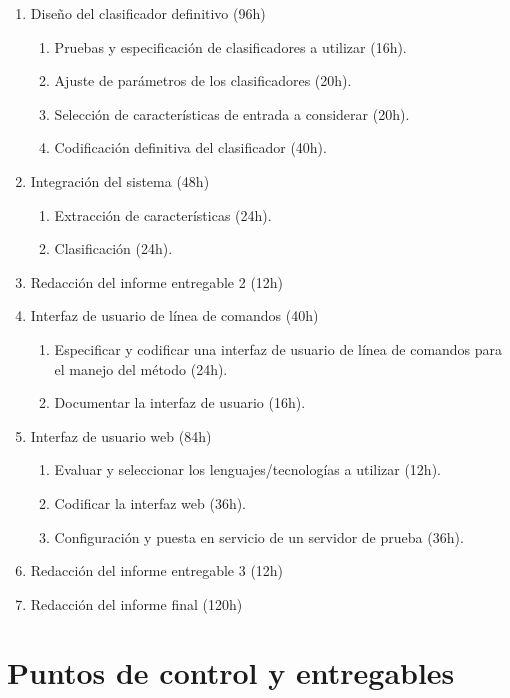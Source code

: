 \documentclass[bibliography=openstyle,DIV=12]{scrartcl}
\begin{document}
\begin{enumerate}
\item Diseño del clasificador definitivo (96h)
  \begin{enumerate}
  \item Pruebas y especificación de clasificadores a utilizar (16h).
  \item Ajuste de parámetros de los clasificadores (20h).
  \item Selección de características de entrada a considerar (20h).
  \item Codificación definitiva del clasificador (40h).
  \end{enumerate}
\item Integración del sistema (48h)
  \begin{enumerate}
  \item Extracción de características (24h).
  \item Clasificación (24h).
  \end{enumerate}
\item Redacción del informe entregable 2 (12h)
\item Interfaz de usuario de línea de comandos (40h)
  \begin{enumerate}
  \item Especificar y codificar una interfaz de usuario de línea de comandos para el manejo del método (24h).
  \item Documentar la interfaz de usuario (16h).
  \end{enumerate}
\item Interfaz de usuario web (84h)
  \begin{enumerate}
  \item Evaluar y seleccionar los lenguajes/tecnologías a utilizar (12h).
  \item Codificar la interfaz web (36h).
  \item Configuración y puesta en servicio de un servidor de prueba (36h).
  \end{enumerate}
\item Redacción del informe entregable 3 (12h)
\item Redacción del informe final (120h)
\end{enumerate}
%
\section{Puntos de control y entregables}
\end{document}
